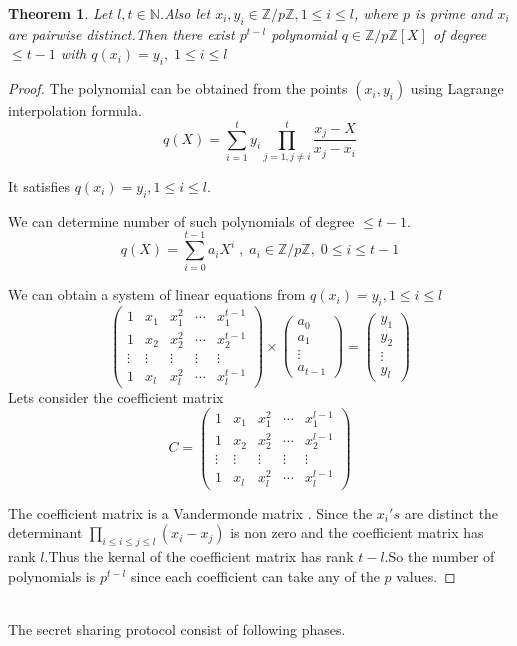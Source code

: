 \documentclass[conference]{IEEEtran}
\newtheorem{thrm}{Theorem}
\newtheorem{proof}{Proof}
\begin{document}
\begin{thrm}
	Let $l,t \in \mathbb{N}$.Also let $x_i,y_i \in \mathbb{Z}/p\mathbb{Z}, 1 \le i \le l$, where $p$ is prime and $x_i$ are pairwise distinct.Then there exist $p^{t-l}$ polynomial $q \in \mathbb{Z}/p\mathbb{Z}[X]$ of degree $\le t-1$
	with $q(x_i)=y_i,\; 1 \le i \le l$
\end{thrm}
\begin{proof}
	The polynomial can be obtained from the points $(x_i,y_i)$ using Lagrange interpolation formula.
	$$
	q(X)=\sum\limits_{i=1}^{t}y_i \prod\limits_{j=1,j\ne i}^{t}\frac{x_j-X}{x_j-x_i}$$
	
It satisfies $q(x_i)=y_i, 1 \le i \le l$.

We can determine number of such polynomials of degree $ \le t-1$.
$$q(X)= \sum\limits_{i=0}^{t-1} a_iX^i \; ,\; a_i \in \mathbb{Z}/p\mathbb{Z},\; 0\le i \le t-1$$ 

We can obtain a system of linear equations from $q(x_i)=y_i, 1 \le i \le l$
$$
 \begin{pmatrix} 1 & x_1 & x_1^2 &\cdots & x_1^{t-1} \\ 
                 1 & x_2 & x_2^2 &\cdots & x_2^{t-1} \\
           \vdots  & \vdots & \vdots &\vdots & \vdots \\
                 1 & x_l & x_l^2 &\cdots & x_l^{t-1} 
                  \end{pmatrix} \times 
                  \begin{pmatrix}
                 a_0 \\
                 a_1\\
                 \vdots \\
                 a_{t-1} 
                   \end{pmatrix}= \begin{pmatrix}
                   y_1 \\
                   y_2\\
                   \vdots \\
                   y_l 
                   \end{pmatrix}
$$
Lets consider the coefficient matrix 
$$C=\begin{pmatrix} 1 & x_1 & x_1^2 &\cdots & x_1^{l-1} \\ 
1 & x_2 & x_2^2 &\cdots & x_2^{l-1} \\
\vdots  & \vdots & \vdots &\vdots & \vdots \\
1 & x_l & x_l^2 &\cdots & x_l^{l-1} 
\end{pmatrix}
$$

The coefficient matrix is a Vandermonde matrix \cite{bjorck1970solution}. Since the $x_i's$ are distinct the determinant $\prod\limits_{i \le i \le j \le l}^{}(x_i-x_j)$ is non zero and the coefficient matrix has rank $l$.Thus the kernal of the coefficient matrix has rank $t-l$.So the number of polynomials is $p^{t-l}$ since each coefficient can take any of the $p$ values.
\end{proof}
\  \\
The secret sharing protocol consist of following phases.\\
\end{document}
